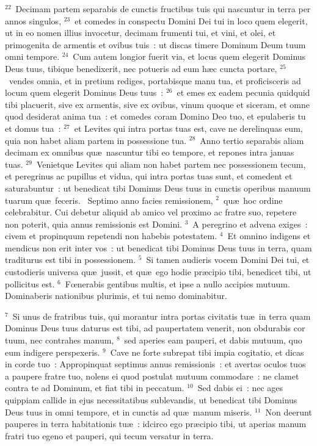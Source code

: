 ${}^{22}$~Decimam partem separabis de cunctis fructibus tuis qui nascuntur in terra per annos singulos,
${}^{23}$~et comedes in conspectu Domini Dei tui in loco quem elegerit, ut in eo nomen illius invocetur, decimam frumenti tui, et vini, et olei, et primogenita de armentis et ovibus tuis~: ut discas timere Dominum Deum tuum omni tempore.
${}^{24}$~Cum autem longior fuerit via, et locus quem elegerit Dominus Deus tuus, tibique benedixerit, nec potueris ad eum h\ae c cuncta portare,
${}^{25}$~vendes omnia, et in pretium rediges, portabisque manu tua, et proficisceris ad locum quem elegerit Dominus Deus tuus~:
${}^{26}$~et emes ex eadem pecunia quidquid tibi placuerit, sive ex armentis, sive ex ovibus, vinum quoque et siceram, et omne quod desiderat anima tua~: et comedes coram Domino Deo tuo, et epulaberis tu et domus tua~:
${}^{27}$~et Levites qui intra portas tuas est, cave ne derelinquas eum, quia non habet aliam partem in possessione tua.
${}^{28}$~Anno tertio separabis aliam decimam ex omnibus qu\ae\ nascuntur tibi eo tempore, et repones intra januas tuas.
${}^{29}$~Venietque Levites qui aliam non habet partem nec possessionem tecum, et peregrinus ac pupillus et vidua, qui intra portas tuas sunt, et comedent et saturabuntur~: ut benedicat tibi Dominus Deus tuus in cunctis operibus manuum tuarum qu\ae\ feceris.
~Septimo anno facies remissionem,
${}^{2}$~qu\ae\ hoc ordine celebrabitur. Cui debetur aliquid ab amico vel proximo ac fratre suo, repetere non poterit, quia annus remissionis est Domini.
${}^{3}$~A peregrino et advena exiges~: civem et propinquum repetendi non habebis potestatem.
${}^{4}$~Et omnino indigens et mendicus non erit inter vos~: ut benedicat tibi Dominus Deus tuus in terra, quam traditurus est tibi in possessionem.
${}^{5}$~Si tamen audieris vocem Domini Dei tui, et custodieris universa qu\ae\ jussit, et qu\ae\ ego hodie pr\ae cipio tibi, benedicet tibi, ut pollicitus est.
${}^{6}$~Fœnerabis gentibus multis, et ipse a nullo accipies mutuum. Dominaberis nationibus plurimis, et tui nemo dominabitur.


${}^{7}$~Si unus de fratribus tuis, qui morantur intra portas civitatis tu\ae\ in terra quam Dominus Deus tuus daturus est tibi, ad paupertatem venerit, non obdurabis cor tuum, nec contrahes manum,
${}^{8}$~sed aperies eam pauperi, et dabis mutuum, quo eum indigere perspexeris.
${}^{9}$~Cave ne forte subrepat tibi impia cogitatio, et dicas in corde tuo~: Appropinquat septimus annus remissionis~: et avertas oculos tuos a paupere fratre tuo, nolens ei quod postulat mutuum commodare~: ne clamet contra te ad Dominum, et fiat tibi in peccatum.
${}^{10}$~Sed dabis ei~: nec ages quippiam callide in ejus necessitatibus sublevandis, ut benedicat tibi Dominus Deus tuus in omni tempore, et in cunctis ad qu\ae\ manum miseris.
${}^{11}$~Non deerunt pauperes in terra habitationis tu\ae~: idcirco ego pr\ae cipio tibi, ut aperias manum fratri tuo egeno et pauperi, qui tecum versatur in terra.



